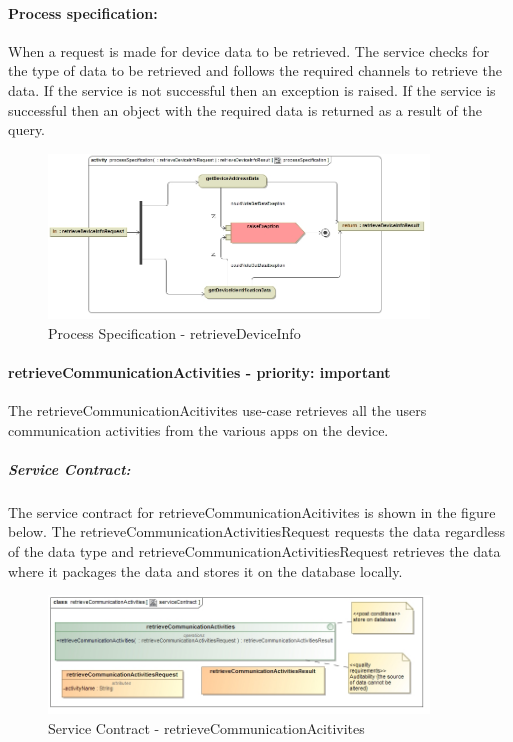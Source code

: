 \documentclass[hidelinks, 12pt, oneside]{article}
\begin{document}
		
		\paragraph{Process specification:}
		When a request is made for device data to be retrieved. The service checks for the type of data to 			be retrieved and follows the required channels to retrieve the data. If the service is not 					successful then an exception is raised. If the service is successful then an object with the 				required data is returned as a result of the query.
		
		\begin{figure}[!htbp]
    		\centering
    		\includegraphics[width=0.9\textwidth]{img/processSpecificationRetrieveDeviceInfo.jpg}
    		\caption{Process Specification - retrieveDeviceInfo}
    		\label{fig:ProcessSpec_retrieveDeviceInfo}
		\end{figure}
		
		
		\paragraph{retrieveCommunicationActivities - priority: important}
		The retrieveCommunicationAcitivites use-case retrieves all the users communication activities from 		the various apps on the device.\newpage
		
		\subparagraph{Service Contract:}
		The service contract for retrieveCommunicationAcitivites is shown in the figure below. The 					retrieveCommunicationActivitiesRequest requests the data regardless of the data type and 		retrieveCommunicationActivitiesRequest retrieves the data where it packages the data and stores it on the database locally.
		
		\begin{figure}[!htbp]
    		\centering
    		\includegraphics[width=0.9\textwidth]{img/serviceContractRetrieveCommunicationActivities.jpg}
    		\caption{Service Contract - retrieveCommunicationAcitivites}
    		\label{fig:ServiceCon_retrieveCommunicationAcitivites}
		\end{figure}
				
\end{document}

